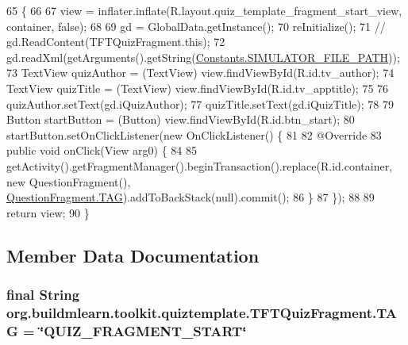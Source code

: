 \begin{DoxyCode}
65                                                                                                       \{
66 
67         view = inflater.inflate(R.layout.quiz\_template\_fragment\_start\_view, container, \textcolor{keyword}{false});
68 
69         gd = GlobalData.getInstance();
70         reInitialize();
71         \textcolor{comment}{// gd.ReadContent(TFTQuizFragment.this);}
72         gd.readXml(getArguments().getString(\hyperlink{classorg_1_1buildmlearn_1_1toolkit_1_1constant_1_1Constants_a5e8ea6ec23e727cbfc84e5b854ae311c}{Constants.SIMULATOR\_FILE\_PATH}));
73         TextView quizAuthor = (TextView) view.findViewById(R.id.tv\_author);
74         TextView quizTitle = (TextView) view.findViewById(R.id.tv\_apptitle);
75 
76         quizAuthor.setText(gd.iQuizAuthor);
77         quizTitle.setText(gd.iQuizTitle);
78 
79         Button startButton = (Button) view.findViewById(R.id.btn\_start);
80         startButton.setOnClickListener(\textcolor{keyword}{new} OnClickListener() \{
81 
82             @Override
83             \textcolor{keyword}{public} \textcolor{keywordtype}{void} onClick(View arg0) \{
84 
85                 getActivity().getFragmentManager().beginTransaction().replace(R.id.container, \textcolor{keyword}{new} 
      QuestionFragment(), \hyperlink{classorg_1_1buildmlearn_1_1toolkit_1_1quiztemplate_1_1QuestionFragment_a921fda4a087f9a43ebe8a4f05eec015c}{QuestionFragment.TAG}).addToBackStack(null).commit();
86             \}
87         \});
88 
89         \textcolor{keywordflow}{return} view;
90     \}
\end{DoxyCode}


\subsection{Member Data Documentation}
\hypertarget{classorg_1_1buildmlearn_1_1toolkit_1_1quiztemplate_1_1TFTQuizFragment_a7afa4100530fdde30947cc71add19eb8}{
\subsubsection[{T\-A\-G}]{\setlength{\rightskip}{0pt plus 5cm}final String org.\-buildmlearn.\-toolkit.\-quiztemplate.\-T\-F\-T\-Quiz\-Fragment.\-T\-A\-G = \char`\"{}Q\-U\-I\-Z\-\_\-\-F\-R\-A\-G\-M\-E\-N\-T\-\_\-\-S\-T\-A\-R\-T\char`\"{}\hspace{0.3cm}{\ttfamily [static]}}}\label{classorg_1_1buildmlearn_1_1toolkit_1_1quiztemplate_1_1TFTQuizFragment_a7afa4100530fdde30947cc71add19eb8}


